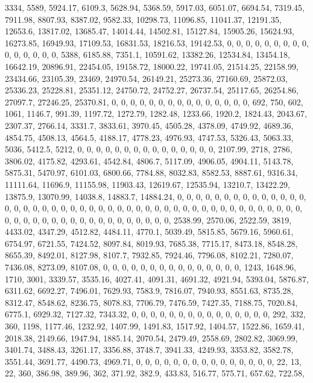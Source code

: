\documentclass[
]{article}
\begin{document}
3334, 5589, 5924.17, 6109.3, 5628.94, 5368.59, 5917.03, 6051.07,
6694.54, 7319.45, 7911.98, 8807.93, 8387.02, 9582.33, 10298.73,
11096.85, 11041.37, 12191.35, 12653.6, 13817.02, 13685.47, 14014.44,
14502.81, 15127.84, 15905.26, 15624.93, 16273.85, 16949.93, 17109.53,
16831.53, 18216.53, 19142.53, 0, 0, 0, 0, 0, 0, 0, 0, 0, 0, 0, 0, 0, 0,
0, 5388, 6185.88, 7351.1, 10591.62, 13382.26, 12534.84, 13454.18,
16642.19, 20896.91, 22454.05, 19158.72, 18000.22, 19741.05, 21514.25,
22158.99, 23434.66, 23105.39, 23469, 24970.54, 26149.21, 25273.36,
27160.69, 25872.03, 25336.23, 25228.81, 25351.12, 24750.72, 24752.27,
26737.54, 25117.65, 26254.86, 27097.7, 27246.25, 25370.81, 0, 0, 0, 0,
0, 0, 0, 0, 0, 0, 0, 0, 0, 0, 0, 692, 750, 602, 1061, 1146.7, 991.39,
1197.72, 1272.79, 1282.48, 1233.66, 1920.2, 1824.43, 2043.67, 2307.37,
2766.14, 3331.7, 3833.61, 3970.45, 4505.28, 4378.09, 4749.92, 4689.36,
4854.75, 4508.13, 4564.5, 4188.17, 4778.23, 4976.93, 4747.53, 5326.43,
5063.33, 5036, 5412.5, 5212, 0, 0, 0, 0, 0, 0, 0, 0, 0, 0, 0, 0, 0, 0,
0, 2107.99, 2718, 2786, 3806.02, 4175.82, 4293.61, 4542.84, 4806.7,
5117.09, 4906.05, 4904.11, 5143.78, 5875.31, 5470.97, 6101.03, 6800.66,
7784.88, 8032.83, 8582.53, 8887.61, 9316.34, 11111.64, 11696.9,
11155.98, 11903.43, 12619.67, 12535.94, 13210.7, 13422.29, 13875.9,
13070.99, 14038.8, 14883.7, 14884.24, 0, 0, 0, 0, 0, 0, 0, 0, 0, 0, 0,
0, 0, 0, 0, 0, 0, 0, 0, 0, 0, 0, 0, 0, 0, 0, 0, 0, 0, 0, 0, 0, 0, 0, 0,
0, 0, 0, 0, 0, 0, 0, 0, 0, 0, 0, 0, 0, 0, 0, 0, 0, 0, 0, 0, 0, 0, 0, 0,
0, 0, 0, 0, 0, 2538.99, 2570.06, 2522.59, 3819, 4433.02, 4347.29,
4512.82, 4484.11, 4770.1, 5039.49, 5815.85, 5679.16, 5960.61, 6754.97,
6721.55, 7424.52, 8097.84, 8019.93, 7685.38, 7715.17, 8473.18, 8548.28,
8655.39, 8492.01, 8127.98, 8107.7, 7932.85, 7924.46, 7796.08, 8102.21,
7280.07, 7436.08, 8273.09, 8107.08, 0, 0, 0, 0, 0, 0, 0, 0, 0, 0, 0, 0,
0, 0, 0, 1243, 1648.96, 1710, 3001, 3339.57, 3535.16, 4027.41, 4091.31,
4691.32, 4921.94, 5393.04, 5876.87, 6311.62, 6692.27, 7496.01, 7629.93,
7583.9, 7816.07, 7940.93, 8551.63, 8735.28, 8312.47, 8548.62, 8236.75,
8078.83, 7706.79, 7476.59, 7427.35, 7188.75, 7020.84, 6775.1, 6929.32,
7127.32, 7343.32, 0, 0, 0, 0, 0, 0, 0, 0, 0, 0, 0, 0, 0, 0, 0, 292, 332,
360, 1198, 1177.46, 1232.92, 1407.99, 1491.83, 1517.92, 1404.57,
1522.86, 1659.41, 2018.38, 2149.66, 1947.94, 1885.14, 2070.54, 2479.49,
2558.69, 2802.82, 3069.99, 3401.74, 3488.43, 3261.17, 3356.88, 3748.7,
3941.33, 4249.93, 3353.82, 3582.78, 3551.44, 3691.77, 4490.73, 4969.71,
0, 0, 0, 0, 0, 0, 0, 0, 0, 0, 0, 0, 0, 0, 0, 22, 13, 22, 360, 386.98,
389.96, 362, 371.92, 382.9, 433.83, 516.77, 575.71, 657.62, 722.58,
\end{document}
